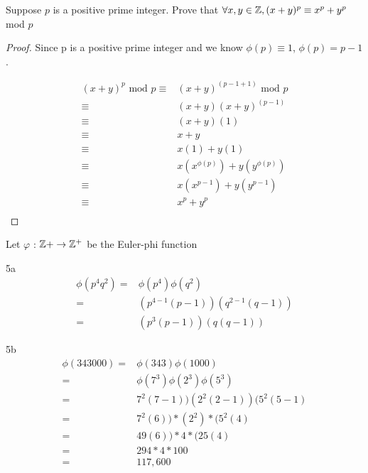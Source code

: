 \begin{question}{4}
Suppose $p$ is a positive prime integer. Prove that $\forall x,y \in \mathbb{Z}, (x+y)^p \equiv x^p + y^p$ mod $p$

\begin{proof}
Since p is a positive prime integer and we know $\phi(p) \equiv 1$, $\phi(p) = p-1$.

\begin{align*}
(x+y)^p \textrm{ mod } p \equiv & (x+y)^{(p-1+1)} \textrm{ mod } p\\
\equiv & (x+y)(x+y)^{(p-1)}\\
\equiv & (x+y)(1)\\
\equiv & x+y\\
\equiv & x(1)+y(1)\\
\equiv & x(x^{\phi(p)})+y(y^{\phi(p)})\\
\equiv & x(x^{p-1})+y(y^{p-1})\\
\equiv & x^{p}+y^{p}\\
\end{align*}




\end{proof}
\end{question}


\begin{question}{5}
Let $\varphi$ : $\mathbb{Z}+ \rightarrow \mathbb{Z}^+$ be the Euler-phi function
\end{question}


\begin{question}{5a}
\begin{align*}
\phi(p^4q^2) =& \phi(p^4)\phi(q^2)\\
=& (p^{4-1}(p-1))(q^{2-1}(q-1))\\
=& (p^{3}(p-1))(q(q-1))
\end{align*}
\end{question}

\begin{question}{5b}
\begin{align*}
\phi(343000) =& \phi(343)\phi(1000)\\
=& \phi(7^3)\phi(2^3)\phi(5^3)\\
=& 7^2(7-1)) (2^2(2-1)) (5^2(5-1)\\
=& 7^2(6))*(2^2)*(5^2(4)\\
=& 49(6))*4*(25(4)\\
=& 294*4*100\\
=& 117,600
\end{align*}
\end{question}

